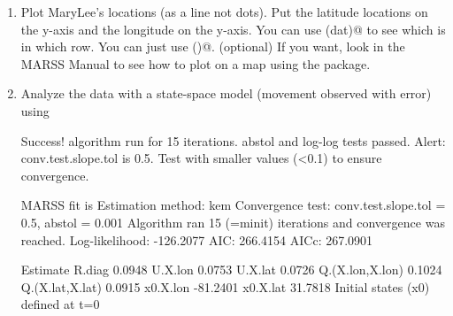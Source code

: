 \begin{hwenumerate}
\begin{enumerate}[label=\alph*)]
\item Plot MaryLee's locations (as a line not dots).  Put the latitude locations on the y-axis and the longitude on the y-axis. You can use \verb@rownames(dat)@ to see which is in which row. You can just use \verb@plot()@. (optional) If you want, look in the MARSS Manual to see how to plot on a map using the \verb@maps@ package.
\item Analyze the data with a state-space model (movement observed with error) using
\begin{Schunk}
\begin{Soutput}
Success! algorithm run for 15 iterations. abstol and log-log tests passed.
Alert: conv.test.slope.tol is 0.5.
Test with smaller values (<0.1) to ensure convergence.

MARSS fit is
Estimation method: kem 
Convergence test: conv.test.slope.tol = 0.5, abstol = 0.001
Algorithm ran 15 (=minit) iterations and convergence was reached. 
Log-likelihood: -126.2077 
AIC: 266.4154   AICc: 267.0901   
 
                Estimate
R.diag            0.0948
U.X.lon           0.0753
U.X.lat           0.0726
Q.(X.lon,X.lon)   0.1024
Q.(X.lat,X.lat)   0.0915
x0.X.lon        -81.2401
x0.X.lat         31.7818
Initial states (x0) defined at t=0


\end{Soutput}
\end{Schunk}
\end{enumerate}
\end{hwenumerate}
